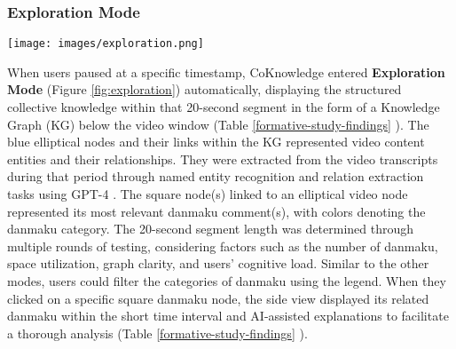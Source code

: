 \subsubsection{Exploration Mode}
\label{exploration-mode}
\begin{figure*}[h]
  \centering
  \texttt{[image: images/exploration.png]}
  \caption{Interface of Exploration Mode. C1: Knowledge graph with legend filter. D1: Related danmaku display. D2: AI-assisted explanation. D3: Subtitle-danmaku list. The explanation of each feature is in sections \hyperref[exploration-mode] {4.3.3} and \hyperref[side-view]{4.3.4}.}\label{fig:exploration}
\end{figure*}


When users paused at a specific timestamp, CoKnowledge entered \textbf{Exploration Mode} (Figure \ref{fig:exploration}) automatically, displaying the structured collective knowledge within that 20-second segment in the form of a Knowledge Graph (KG) 
below the video window (Table \ref{formative-study-findings} ). The blue elliptical nodes and their links within the KG represented video content entities and their relationships. They were extracted from the video transcripts during that period through named entity recognition and relation extraction tasks using GPT-4 \cite{achiam2023gpt} 
. The square node(s) linked to an elliptical video node represented its most relevant danmaku comment(s), with colors denoting the danmaku category. 
The 20-second segment length was determined through multiple rounds of testing, considering factors such as the number of danmaku, space utilization, graph clarity, and users’ cognitive load.
Similar to the other modes, users could filter the categories of danmaku using the legend. When they clicked on a specific square danmaku node, the side view displayed its related danmaku within the short time interval and AI-assisted explanations to facilitate a thorough analysis (Table \ref{formative-study-findings} ). 



